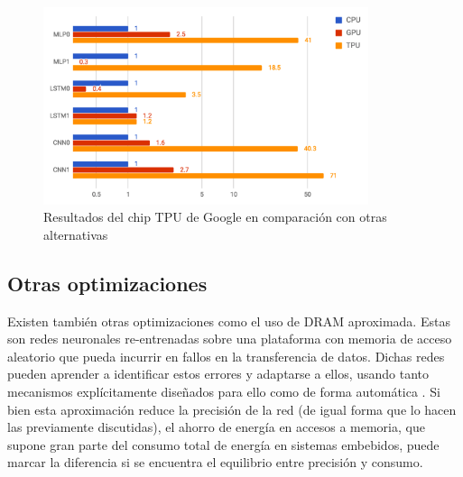 \begin{figure}[h!]
    \centering
    \includegraphics[width=0.85\textwidth]{img/tpu_benchmarks.png}
    \caption{Resultados del chip TPU de Google en comparación con otras alternativas}
    \label{fig:tpu_benchmarks}
\end{figure}

\subsection{Otras optimizaciones}
\label{ssec:otras_optimizaciones}
Existen también otras optimizaciones como el uso de DRAM aproximada. Estas son redes neuronales re-entrenadas sobre una plataforma con memoria de acceso aleatorio que pueda incurrir en fallos en la transferencia de datos. Dichas redes pueden aprender a identificar estos errores y adaptarse a ellos, usando tanto mecanismos explícitamente diseñados para ello como de forma automática \cite{deep_learning_for_computer_architects} \cite{koppula2019eden}. Si bien esta aproximación reduce la precisión de la red (de igual forma que lo hacen las previamente discutidas), el ahorro de energía en accesos a memoria, que supone gran parte del consumo total de energía en sistemas embebidos, puede marcar la diferencia si se encuentra el equilibrio entre precisión y consumo.